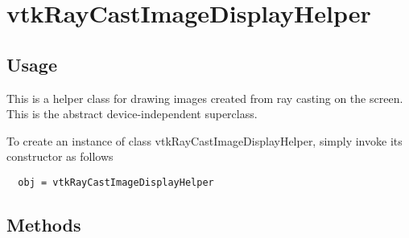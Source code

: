 \section{vtkRayCastImageDisplayHelper}

\subsection{Usage}

 This is a helper class for drawing images created from ray casting on the screen.
 This is the abstract device-independent superclass.

To create an instance of class vtkRayCastImageDisplayHelper, simply
invoke its constructor as follows
\begin{verbatim}
  obj = vtkRayCastImageDisplayHelper
\end{verbatim}
\subsection{Methods}

